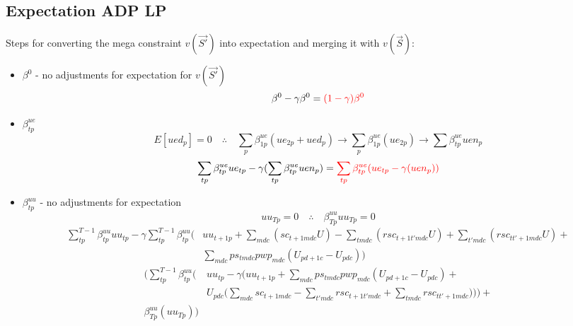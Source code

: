 \documentclass{article}
\begin{document}
\subsection{Expectation ADP LP}
Steps for converting the mega constraint $v(\vec{S'})$ into expectation and merging it with $v({\vec{S}})$:
\begin{itemize}
	\item $\beta^{0}$ - no adjustments for expectation for $v(\vec{S'})$ 
	\begin{equation*}
		\beta^{0} - \gamma \beta^{0} = \color{red} (1-\gamma) \beta^{0}
	\end{equation*}
	
	\item $\beta_{tp}^{ue}$
	\begin{equation*}
		E[ued_{p}] = 0 \quad \therefore \quad
		\sum_{p} \beta_{1p}^{ue} (ue_{2p} + ued_{p}) \rightarrow 
		\sum_{p} \beta_{1p}^{ue} (ue_{2p}) \rightarrow
		\sum \beta_{tp}^{ue} uen_{p}
	\end{equation*}
	\begin{equation*}
		\sum_{tp} \beta_{tp}^{ue} ue_{tp} - \gamma (\sum_{tp} \beta_{tp}^{ue} uen_{p}) = 
		\color{red} \sum_{tp} \beta_{tp}^{ue} (ue_{tp} - \gamma (uen_{p}))
	\end{equation*}
		
	\item $\beta_{tp}^{uu}$ - no adjustments for expectation
	\begin{equation*}
		uu_{Tp} = 0 \quad \therefore \quad \beta_{Tp}^{uu} uu_{Tp} = 0
	\end{equation*}
	\begin{align*}
		\sum_{tp}^{T-1} \beta_{tp}^{uu} uu_{tp} - \gamma \sum_{tp}^{T-1} \beta_{tp}^{uu} \bigg( 
					& uu_{t+1p} + \sum_{mdc} (sc_{t+1mdc}U)  - \sum_{tmdc} (rsc_{t+1t'mdc} U) + \sum_{t'mdc} (rsc_{tt'+1mdc} U) + \\ 
					&\sum_{mdc} ps_{tmdc}pwp_{mdc} (U_{pd+1c} - U_{pdc}) \bigg)
	\end{align*}
	{ \color{red} \begin{align*}
		 \Bigg( \sum_{tp}^{T-1} \beta_{tp}^{uu} \bigg( & 
		 	uu_{tp}	 - \gamma \Big( uu_{t+1p} + \sum_{mdc} ps_{tmdc}pwp_{mdc} (U_{pd+1c} - U_{pdc}) + \\
			& U_{pdc} \big( \sum_{mdc} sc_{t+1mdc}  - \sum_{t'mdc} rsc_{t+1t'mdc} + \sum_{tmdc} rsc_{tt'+1mdc} \big) \Big) \bigg) + \\
		\beta_{Tp}^{uu} (uu_{Tp}) \Bigg)
	\end{align*} }
	

\end{itemize}
\end{document}
